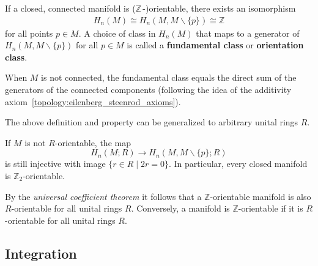 
    \begin{property}[Orientability]\label{bundle:orientation_class}
        If a closed, connected manifold is ($\mathbb{Z}\,$-)orientable, there exists an isomorphism
        \begin{gather}
            H_n(M)\cong H_n(M,M\backslash\{p\})\cong\mathbb{Z}
        \end{gather}
        for all points $p\in M$. A choice of class in $H_n(M)$ that maps to a generator of $H_n(M,M\backslash\{p\})$ for all $p\in M$ is called a \textbf{fundamental class} or \textbf{orientation class}.

        When $M$ is not connected, the fundamental class equals the direct sum of the generators of the connected components (following the idea of the additivity axiom~\ref{topology:eilenberg_steenrod_axioms}).
    \end{property}
    The above definition and property can be generalized to arbitrary unital rings $R$.

    \begin{property}
        If $M$ is not $R$-orientable, the map \[H_n(M;R)\rightarrow H_n(M,M\backslash\{p\};R)\] is still injective with image $\{r\in R\mid 2r=0\}$. In particular, every closed manifold is $\mathbb{Z}_2$-orientable.
    \end{property}

    \begin{property}
        By the \textit{universal coefficient theorem} it follows that a $\mathbb{Z}$-orientable manifold is also $R$-orientable for all unital rings $R$. Conversely, a manifold is $\mathbb{Z}$-orientable if it is $R$-orientable for all unital rings $R$.
    \end{property}

\subsection{Integration}

